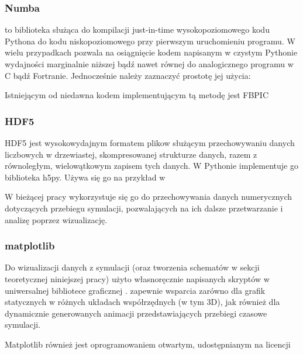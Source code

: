     \subsubsection{Numba}
     to biblioteka służąca do kompilacji just-in-time wysokopoziomowego
    kodu Pythona do kodu niskopoziomowego przy pierwszym uruchomieniu programu. W
    wielu przypadkach pozwala na osiągnięcie kodem napisanym w czystym Pythonie
    wydajności marginalnie niższej bądź nawet równej do analogicznego programu w C
    bądź Fortranie.  Jednocześnie należy zaznaczyć prostotę jej
    użycia:


    Istniejącym od niedawna kodem implementującym tą metodę jest FBPIC

    \subsubsection{HDF5}
    HDF5 jest wysokowydajnym formatem plikow służącym przechowywaniu danych
    liczbowych w drzewiastej, skompresowanej strukturze danych, razem z
    równoległym, wielowątkowym zapisem tych danych.  W Pythonie implementuje go
    biblioteka h5py.  Używa się go na przykład w

    W bieżącej pracy wykorzystuje się go do przechowywania danych numerycznych
    dotyczących przebiegu symulacji, pozwalających na ich dalsze przetwarzanie
    i analizę poprzez wizualizację.

    \subsubsection{matplotlib}
    Do wizualizacji danych z symulacji (oraz tworzenia schematów w sekcji
    teoretycznej niniejszej pracy) użyto własnoręcznie napisanych skryptów w
    uniwersalnej bibliotece graficznej . 
    zapewnie wsparcia zarówno dla grafik statycznych w różnych układach
    współrzędnych (w tym 3D), jak również dla dynamicznie generowanych animacji
    przedstawiających przebiegi czasowe symulacji.

    Matplotlib również jest oprogramowaniem otwartym, udostępnianym na licencji

